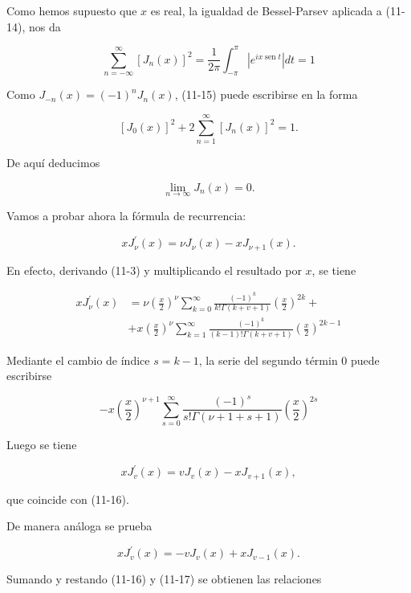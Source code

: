 \documentclass[10pt]{article}
\theoremstyle{plain}
\theoremstyle{definition}
\theoremstyle{remark}
\begin{document}
Como hemos supuesto que $x$ es real, la igualdad de Bessel-Parsev aplicada a (11-14), nos da


\begin{equation*}
\sum_{n=-\infty}^{\infty}\left[J_{n}(x)\right]^{2}=\frac{1}{2 \pi} \int_{-\pi}^{\pi}\left|e^{i x \operatorname{sen} t}\right| d t=1 \tag{$(11.15$}
\end{equation*}


Como $J_{-n}(x)=(-1)^{n} J_{n}(x)$, (11-15) puede escribirse en la forma

$$
\left[J_{0}(x)\right]^{2}+2 \sum_{n=1}^{\infty}\left[J_{n}(x)\right]^{2}=1 .
$$

De aquí deducimos

$$
\lim _{n \rightarrow \infty} J_{n}(x)=0 .
$$

Vamos a probar ahora la fórmula de recurrencia:


\begin{equation*}
x J_{\nu}^{\prime}(x)=\nu J_{\nu}(x)-x J_{\nu+1}(x) . \tag{11-16}
\end{equation*}


En efecto, derivando (11-3) y multiplicando el resultado por $x$, se tiene

$$
\begin{aligned}
x J_{\nu}^{\prime}(x) & =\nu\left(\frac{x}{2}\right)^{\nu} \sum_{k=0}^{\infty} \frac{(-1)^{k}}{k!\Gamma(k+v+1)}\left(\frac{x}{2}\right)^{2 k}+ \\
& +x\left(\frac{x}{2}\right)^{\nu} \sum_{k=1}^{\infty} \frac{(-1)^{k}}{(k-1)!\Gamma(k+v+1)}\left(\frac{x}{2}\right)^{2 k-1}
\end{aligned}
$$

Mediante el cambio de índice $s=k-1$, la serie del segundo términ 0 puede escribirse

$$
-x\left(\frac{x}{2}\right)^{\nu+1} \sum_{s=0}^{\infty} \frac{(-1)^{s}}{s!\Gamma(\nu+1+s+1)}\left(\frac{x}{2}\right)^{2 s}
$$

Luego se tiene

$$
x J_{v}^{\prime}(x)=v J_{v}(x)-x J_{v+1}(x),
$$

que coincide con (11-16).

De manera análoga se prueba


\begin{equation*}
x J_{v}^{\prime}(x)=-v J_{v}(x)+x J_{v-1}(x) . \tag{11-17}
\end{equation*}


Sumando y restando (11-16) y (11-17) se obtienen las relaciones
\end{document}
